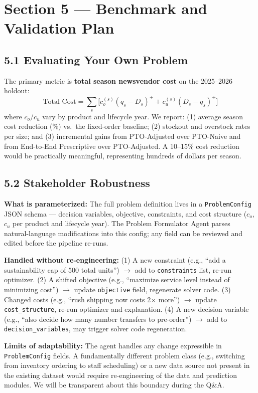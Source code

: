 \documentclass[11pt]{article}
\begin{document}
\section{Section 5 — Benchmark and Validation Plan}

\subsection*{5.1 \; Evaluating Your Own Problem}

The primary metric is \textbf{total season newsvendor cost} on the 2025--2026 holdout:
\[
  \text{Total Cost} = \textstyle\sum_{s} \bigl[ c_o^{(s)}(q_s - D_s)^+ + c_u^{(s)}(D_s - q_s)^+ \bigr]
\]
where $c_o$/$c_u$ vary by product and lifecycle year. We report: (1) average season cost reduction
(\%) vs.\ the fixed-order baseline; (2) stockout and overstock rates per size; and (3) incremental
gains from PTO-Adjusted over PTO-Naive and from End-to-End Prescriptive over PTO-Adjusted. A 10--15\%
cost reduction would be practically meaningful, representing hundreds of dollars per season.

\subsection*{5.2 \; Stakeholder Robustness}

\textbf{What is parameterized:} The full problem definition lives in a \texttt{ProblemConfig} JSON
schema --- decision variables, objective, constraints, and cost structure ($c_o$, $c_u$ per product
and lifecycle year). The Problem Formulator Agent parses natural-language modifications into this
config; any field can be reviewed and edited before the pipeline re-runs.

\textbf{Handled without re-engineering:} (1) A new constraint (e.g., ``add a sustainability cap of 500 total units'') $\rightarrow$ add to \texttt{constraints} list, re-run optimizer.
  (2) A shifted objective (e.g., ``maximize service level instead of minimizing cost'') $\rightarrow$ update \texttt{objective} field, regenerate solver code.
  (3) Changed costs (e.g., ``rush shipping now costs 2$\times$ more'') $\rightarrow$ update \texttt{cost\_structure}, re-run optimizer and explanation.
  (4) A new decision variable (e.g., ``also decide how many number transfers to pre-order'') $\rightarrow$ add to \texttt{decision\_variables}, may trigger solver code regeneration.

\textbf{Limits of adaptability:} The agent handles any change expressible in \texttt{ProblemConfig}
fields. A fundamentally different problem class (e.g., switching from inventory ordering to staff
scheduling) or a new data source not present in the existing dataset would require re-engineering of
the data and prediction modules. We will be transparent about this boundary during the Q\&A.
\end{document}
